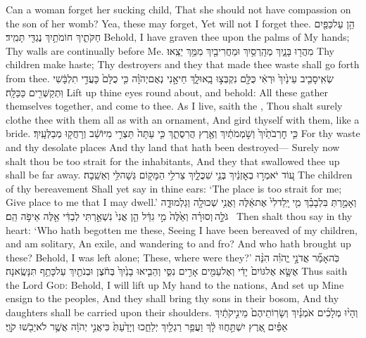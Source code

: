 {Can a woman forget her sucking child, That she should not have compassion on the son of her womb? Yea, these may forget, Yet will not I forget thee.}
{הֵ֥ן עַל\maqqaf כַּפַּ֖יִם חַקֹּתִ֑יךְ חוֹמֹתַ֥יִךְ נֶגְדִּ֖י תָּמִֽיד׃}
{Behold, I have graven thee upon the palms of My hands; Thy walls are continually before Me.}
{מִהֲר֖וּ בָּנָ֑יִךְ מְהָֽרְסַ֥יִךְ וּמַחֲרִיבַ֖יִךְ מִמֵּ֥ךְ יֵצֵֽאוּ׃}
{Thy children make haste; Thy destroyers and they that made thee waste shall go forth from thee.}
{שְׂאִֽי\maqqaf סָבִ֤יב עֵינַ֙יִךְ֙ וּרְאִ֔י כֻּלָּ֖ם נִקְבְּצ֣וּ בָֽאוּ\maqqaf לָ֑ךְ חַי\maqqaf אָ֣נִי נְאֻם\maqqaf יְהֹוָ֗ה כִּ֤י כֻלָּם֙ כָּעֲדִ֣י תִלְבָּ֔שִׁי וּֽתְקַשְּׁרִ֖ים כַּכַּלָּֽה׃}
{Lift up thine eyes round about, and behold: All these gather themselves together, and come to thee. As I live, saith the \lord, Thou shalt surely clothe thee with them all as with an ornament, And gird thyself with them, like a bride.}
{כִּ֤י חׇרְבֹתַ֙יִךְ֙ וְשֹׁ֣מְמֹתַ֔יִךְ וְאֶ֖רֶץ הֲרִסֻתֵ֑ךְ כִּ֤י עַתָּה֙ תֵּצְרִ֣י מִיּוֹשֵׁ֔ב וְרָחֲק֖וּ מְבַלְּעָֽיִךְ׃}
{For thy waste and thy desolate places And thy land that hath been destroyed— Surely now shalt thou be too strait for the inhabitants, And they that swallowed thee up shall be far away.}
{ע֚וֹד יֹאמְר֣וּ בְאׇזְנַ֔יִךְ בְּנֵ֖י שִׁכֻּלָ֑יִךְ צַר\maqqaf לִ֥י הַמָּק֖וֹם גְּשָׁה\maqqaf לִּ֥י וְאֵשֵֽׁבָה׃}
{The children of thy bereavement Shall yet say in thine ears: ‘The place is too strait for me; Give place to me that I may dwell.’}
{וְאָמַ֣רְתְּ בִּלְבָבֵ֗ךְ מִ֤י יָֽלַד\maqqaf לִי֙ אֶת\maqqaf אֵ֔לֶּה וַאֲנִ֥י שְׁכוּלָ֖ה וְגַלְמוּדָ֑ה גֹּלָ֣ה \legarmeh  וְסוּרָ֗ה וְאֵ֙לֶּה֙ מִ֣י גִדֵּ֔ל הֵ֤ן אֲנִי֙ נִשְׁאַ֣רְתִּי לְבַדִּ֔י אֵ֖לֶּה אֵיפֹ֥ה הֵֽם׃ \petucha }
{Then shalt thou say in thy heart: ‘Who hath begotten me these, Seeing I have been bereaved of my children, and am solitary, An exile, and wandering to and fro? And who hath brought up these? Behold, I was left alone; These, where were they?’}
{כֹּֽה\maqqaf אָמַ֞ר אֲדֹנָ֣י יֱהֹוִ֗ה הִנֵּ֨ה אֶשָּׂ֤א אֶל\maqqaf גּוֹיִם֙ יָדִ֔י וְאֶל\maqqaf עַמִּ֖ים אָרִ֣ים נִסִּ֑י וְהֵבִ֤יאוּ בָנַ֙יִךְ֙ בְּחֹ֔צֶן וּבְנֹתַ֖יִךְ עַל\maqqaf כָּתֵ֥ף תִּנָּשֶֽׂאנָה׃}
{Thus saith the Lord \textsc{God}: Behold, I will lift up My hand to the nations, And set up Mine ensign to the peoples, And they shall bring thy sons in their bosom, And thy daughters shall be carried upon their shoulders.}
{וְהָי֨וּ מְלָכִ֜ים אֹמְנַ֗יִךְ וְשָׂרֽוֹתֵיהֶם֙ מֵינִ֣יקֹתַ֔יִךְ אַפַּ֗יִם אֶ֚רֶץ יִשְׁתַּ֣חֲווּ לָ֔ךְ וַעֲפַ֥ר רַגְלַ֖יִךְ יְלַחֵ֑כוּ וְיָדַ֙עַתְּ֙ כִּי\maqqaf אֲנִ֣י יְהֹוָ֔ה אֲשֶׁ֥ר לֹא\maqqaf יֵבֹ֖שׁוּ קֹוָֽי׃ \setuma }
